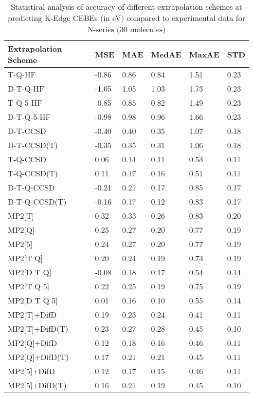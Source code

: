 \begin{table}
  \caption{Statistical analysis of accuracy of different extrapolation schemes at predicting K-Edge CEBEs (in eV) compared to experimental data for N-series (30 molecules)}
  \label{tbl:summary-n}
  \begin{tabular}{l l l l l l }
    \toprule
    \textbf{Extrapolation Scheme} & \textbf{MSE} & \textbf{MAE} & \textbf{MedAE} & \textbf{MaxAE} & \textbf{STD} \\ 
    \midrule
    T-Q-HF & -0.86 & 0.86 & 0.84 & 1.51 & 0.23 \\ 
    D-T-Q-HF & -1.05 & 1.05 & 1.03 & 1.73 & 0.23 \\ 
    T-Q-5-HF & -0.85 & 0.85 & 0.82 & 1.49 & 0.23 \\ 
    D-T-Q-5-HF & -0.98 & 0.98 & 0.96 & 1.66 & 0.23 \\ 
    D-T-CCSD & -0.40 & 0.40 & 0.35 & 1.07 & 0.18 \\ 
    D-T-CCSD(T) & -0.35 & 0.35 & 0.31 & 1.06 & 0.18 \\ 
    T-Q-CCSD & 0.06 & 0.14 & 0.11 & 0.53 & 0.11 \\ 
    T-Q-CCSD(T) & 0.11 & 0.17 & 0.16 & 0.51 & 0.11 \\ 
    D-T-Q-CCSD & -0.21 & 0.21 & 0.17 & 0.85 & 0.17 \\ 
    D-T-Q-CCSD(T) & -0.16 & 0.17 & 0.12 & 0.83 & 0.17 \\ 
    MP2[T] & 0.32 & 0.33 & 0.26 & 0.83 & 0.20 \\ 
    MP2[Q] & 0.25 & 0.27 & 0.20 & 0.77 & 0.19 \\ 
    MP2[5] & 0.24 & 0.27 & 0.20 & 0.77 & 0.19 \\ 
    MP2[T Q] & 0.20 & 0.24 & 0.19 & 0.73 & 0.19 \\ 
    MP2[D T Q] & -0.08 & 0.18 & 0.17 & 0.54 & 0.14 \\ 
    MP2[T Q 5] & 0.22 & 0.25 & 0.19 & 0.75 & 0.19 \\ 
    MP2[D T Q 5] & 0.01 & 0.16 & 0.10 & 0.55 & 0.14 \\ 
    MP2[T]+DifD & 0.19 & 0.23 & 0.24 & 0.41 & 0.11 \\ 
    MP2[T]+DifD(T) & 0.23 & 0.27 & 0.28 & 0.45 & 0.10 \\ 
    MP2[Q]+DifD & 0.12 & 0.18 & 0.16 & 0.46 & 0.11 \\ 
    MP2[Q]+DifD(T) & 0.17 & 0.21 & 0.21 & 0.45 & 0.11 \\ 
    MP2[5]+DifD & 0.12 & 0.17 & 0.15 & 0.46 & 0.11 \\ 
    MP2[5]+DifD(T) & 0.16 & 0.21 & 0.19 & 0.45 & 0.10 \\ 

\end{tabular}
\end{table}
